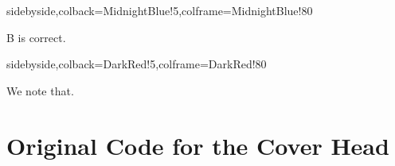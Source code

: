 \documentclass[mtpro2,twoside,openany]{litesolution}
\begin{document}
\begin{minipage}{.48\textwidth}
\begin{tcblisting}{sidebyside,colback=MidnightBlue!5,colframe=MidnightBlue!80}
\begin{solution}
  B is correct.
\end{solution}
\end{tcblisting}
\end{minipage}
\hfill
\begin{minipage}{.48\textwidth}
\begin{tcblisting}{sidebyside,colback=DarkRed!5,colframe=DarkRed!80}
\begin{note}
  We note that.
\end{note}
\end{tcblisting}
\end{minipage}

\section*{Original Code for the Cover Head}


\end{document}
